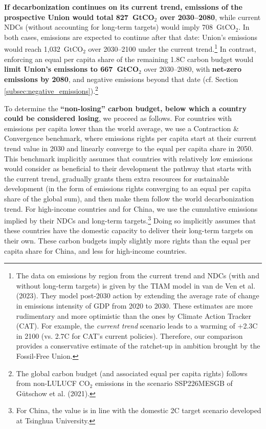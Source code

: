 \documentclass[12pt,english]{article}
\begin{document}
\textbf{If decarbonization continues on its current trend, emissions of the prospective Union would total 827~GtCO$_\text{2}$ over 2030--2080}, while current NDCs (without accounting for long-term targets) would imply 708~GtCO$_\text{2}$. In both cases, emissions are expected to continue after that date: Union's emissions would reach 1,032~GtCO$_\text{2}$ over 2030--2100 under the current trend.\footnote{The data on emissions by region from the current trend and NDCs (with and without long-term targets) is given by the TIAM model in van de Ven et al. (2023)\cite{van_de_ven_multimodel_2023}. They model post-2030 action by extending the average rate of change in emissions intensity of GDP from 2020 to 2030. These estimates are more rudimentary and more optimistic than the ones by Climate Action Tracker (CAT). For example, the \textit{current trend} scenario leads to a warming of +2.3\textdegree{}C in 2100 (vs. 2.7\textdegree{}C for CAT's current policies). Therefore, our comparison provides a conservative estimate of the ratchet-up in ambition brought by the Fossil-Free Union.} %
In contrast, enforcing an equal per capita share of the remaining 1.8\textdegree{}C carbon budget would \textbf{limit Union's emissions to 667~GtCO$_\text{2}$} over 2030--2080, with \textbf{net-zero emissions by 2080}, and negative emissions beyond that date (cf. Section \ref{subsec:negative_emissions}).\footnote{The global carbon budget (and associated equal per capita rights) follows from non-LULUCF CO$_\text{2}$ emissions in the scenario SSP226MESGB of Gütschow et al. (2021).\cite{gutschow_country-resolved_2021}} %

To determine the \textbf{``non-losing'' carbon budget, below which a country could be considered losing}, we proceed as follows. For countries with emissions per capita lower than the world average, we use a Contraction \& Convergence benchmark, where emissions rights per capita start at their current trend value in 2030 and linearly converge to the equal per capita share in 2050. This benchmark implicitly assumes that countries with relatively low emissions would consider as beneficial to their development the pathway that starts with the current trend, gradually grants them extra resources for sustainable development (in the form of emissions rights converging to an equal per capita share of the global sum), and then make them follow the world decarbonization trend. 
For high-income countries and for China, we use the cumulative emissions implied by their NDCs and long-term targets.\footnote{For China, the value is in line with the domestic 2\textdegree{}C target scenario developed at Tsinghua University.\cite{he_towards_2022}} Doing so implicitly assumes that these countries have the domestic capacity to deliver their long-term targets on their own. These carbon budgets imply slightly more rights than the equal per capita share for China, and less for high-income countries. 
\end{document}
